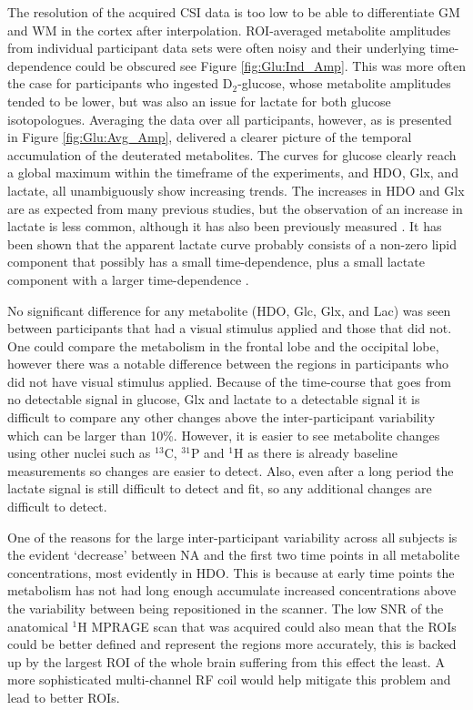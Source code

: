 The resolution of the acquired \ac{CSI} data is too low to be able to differentiate \ac{GM} and \ac{WM} in the cortex after interpolation. \ac{ROI}-averaged metabolite amplitudes from individual participant data sets were often noisy and their underlying time-dependence could be obscured see Figure \ref{fig:Glu:Ind_Amp}. This was more often the case for participants who ingested D$_2$-glucose, whose metabolite amplitudes tended to be lower, but was also an issue for lactate for both glucose isotopologues. Averaging the data over all participants, however, as is presented in Figure \ref{fig:Glu:Avg_Amp}, delivered a clearer picture of the temporal accumulation of the deuterated metabolites. The curves for glucose clearly reach a global maximum within the timeframe of the experiments, and \ac{HDO}, Glx, and lactate, all unambiguously show increasing trends. The increases in \ac{HDO} and Glx are as expected from many previous studies, but the observation of an increase in lactate is less common, although it has also been previously measured  \cite{Ruhm2021DeuteriumResolution, Kaggie2022DeuteriumMetabolism}. It has been shown that the apparent lactate curve probably consists of a non-zero lipid component that possibly has a small time-dependence, plus a small lactate component with a larger time-dependence \cite{Ruhm2021DeuteriumResolution}.     

No significant difference for any metabolite (\ac{HDO}, Glc, Glx, and Lac) was seen between participants that had a visual stimulus applied and those that did not. One could compare the metabolism in the frontal lobe and the occipital lobe, however there was a notable difference between the regions in participants who did not have visual stimulus applied. Because of the time-course that goes from no detectable signal in glucose, Glx and lactate to a detectable signal it is difficult to compare any other changes above the inter-participant variability which can be larger than 10\%. However, it is easier to see metabolite changes using other nuclei such as $^{13}$C, $^{31}$P and $^1$H as there is already baseline measurements so changes are easier to detect. Also, even after a long period the lactate signal is still difficult to detect and fit, so any additional changes are difficult to detect.  

One of the reasons for the large inter-participant variability across all subjects is the evident ‘decrease’ between \ac{NA} and the first two time points in all metabolite concentrations, most evidently in HDO. This is because at early time points the metabolism has not had long enough accumulate increased concentrations above the variability between being repositioned in the scanner. The low \ac{SNR} of the anatomical $^1$H \ac{MPRAGE} scan that was acquired could also mean that the \ac{ROI}s could be better defined and represent the regions more accurately, this is backed up by the largest ROI of the whole brain suffering from this effect the least. A more sophisticated multi-channel RF coil would help mitigate this problem and lead to better \ac{ROI}s.

